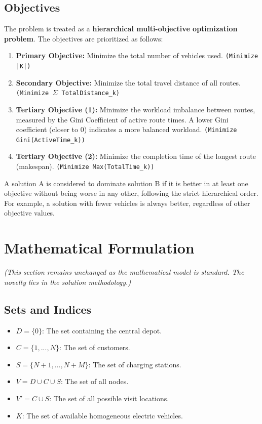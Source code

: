 \documentclass[a4paper,12pt]{article}
\begin{document}
\subsection{Objectives}

The problem is treated as a \textbf{hierarchical multi-objective optimization problem}. The objectives are prioritized as follows:
\begin{enumerate}
    \item \textbf{Primary Objective:} Minimize the total number of vehicles used. \texttt{(Minimize |K|)}
    \item \textbf{Secondary Objective:} Minimize the total travel distance of all routes. \texttt{(Minimize $\Sigma$ TotalDistance_k)}
    \item \textbf{Tertiary Objective (1):} Minimize the workload imbalance between routes, measured by the Gini Coefficient of active route times. A lower Gini coefficient (closer to 0) indicates a more balanced workload. \texttt{(Minimize Gini(ActiveTime_k))}
    \item \textbf{Tertiary Objective (2):} Minimize the completion time of the longest route (makespan). \texttt{(Minimize Max(TotalTime_k))}
\end{enumerate}
A solution A is considered to dominate solution B if it is better in at least one objective without being worse in any other, following the strict hierarchical order. For example, a solution with fewer vehicles is always better, regardless of other objective values.

\section{Mathematical Formulation}

\textit{(This section remains unchanged as the mathematical model is standard. The novelty lies in the solution methodology.)}

\subsection{Sets and Indices}
\begin{itemize}
    \item $D = \{0\}$: The set containing the central depot.
    \item $C = \{1, ..., N\}$: The set of customers.
    \item $S = \{N+1, ..., N+M\}$: The set of charging stations.
    \item $V = D \cup C \cup S$: The set of all nodes.
    \item $V' = C \cup S$: The set of all possible visit locations.
    \item $K$: The set of available homogeneous electric vehicles.
\end{itemize}
\end{document}
